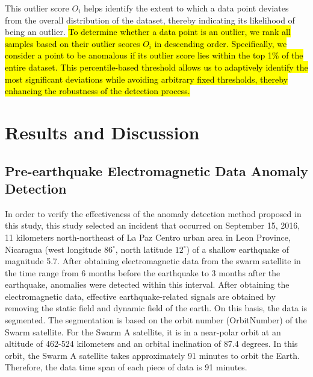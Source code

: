 \documentclass[3p,authoryear,preprint,12pt]{elsarticle}
\begin{document}
This outlier score $O_i$  helps identify the extent to which a data point deviates from the overall distribution of the dataset, thereby indicating its likelihood of being an outlier. \hl{To determine whether a data point is an outlier, we rank all samples based on their outlier scores $O_i$ in descending order. Specifically, we consider a point to be anomalous if its outlier score lies within the top 1\% of the entire dataset. This percentile-based threshold allows us to adaptively identify the most significant deviations while avoiding arbitrary fixed thresholds, thereby enhancing the robustness of the detection process.}   
\section{Results and Discussion}
\subsection{Pre-earthquake Electromagnetic Data Anomaly Detection}
{In order to verify the effectiveness of the anomaly detection method proposed in this study, this study selected an incident that occurred on September 15, 2016, 11 kilometers north-northeast of La Paz Centro urban area in Leon Province, Nicaragua (west longitude $86^\circ$, north latitude $12^\circ$) of a shallow earthquake of magnitude 5.7. After obtaining electromagnetic data from the swarm satellite in the time range from 6 months before the earthquake to 3 months after the earthquake, anomalies were detected within this interval. After obtaining the electromagnetic data, effective earthquake-related signals are obtained by removing the static field and dynamic field of the earth. On this basis, the data is segmented. The segmentation is based on the orbit number (OrbitNumber) of the Swarm satellite. For the Swarm A satellite, it is in a near-polar orbit at an altitude of 462-524 kilometers and an orbital inclination of 87.4 degrees. In this orbit, the Swarm A satellite takes approximately 91 minutes to orbit the Earth. Therefore, the data time span of each piece of data is 91 minutes.}
\end{document}
